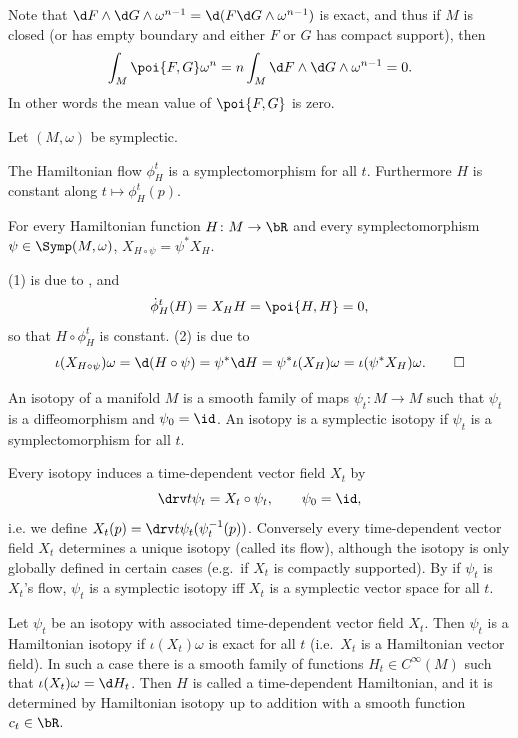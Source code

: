Note that $\d F\wedge\d G\wedge\omega^{n-1}=\d(F\d G\wedge\omega^{n-1})$ is exact, and thus if $M$ is closed (or has empty boundary and either $F$ or $G$ has compact
support), then
$$ \int_M\poi{F,G}\omega^n = n\int_M\d F\wedge\d G\wedge\omega^{n-1} = 0 . $$
In other words the mean value of $\poi{F,G}$ is zero.

\bprop[name={hamflowbasic}]

    Let $(M,\omega)$ be symplectic.
    \benum
        \item The Hamiltonian flow $\phi_H^t$ is a symplectomorphism for all $t$.
        Furthermore $H$ is constant along $t\mapsto\phi_H^t(p)$.
        \item For every Hamiltonian function $H\colon M\to\bR$ and every symplectomorphism $\psi\in\Symp(M,\omega)$, $X_{H\circ\psi}=\psi^*X_H$.
    \eenum

\eprop

\bproof

    (1) is due to , and
    $$ \dot\phi^t_H(H) = X_HH = \poi{H,H} = 0 , $$
    so that $H\circ\phi^t_H$ is constant.
    (2) is due to
    $$ \iota(X_{H\circ\psi})\omega = \d(H\circ\psi) = \psi^*\d H = \psi^*\iota(X_H)\omega = \iota(\psi^*X_H)\omega . \qed $$

\eproof

\bdefn

    An {\emphcolor isotopy} of a manifold $M$ is a smooth family of maps $\psi_t\colon M\to M$ such that $\psi_t$ is a diffeomorphism and $\psi_0=\id$.
    An isotopy is a {\emphcolor symplectic isotopy} if $\psi_t$ is a symplectomorphism for all $t$.

\edefn

Every isotopy induces a time-dependent vector field $X_t$ by
$$ \drv t\psi_t = X_t\circ\psi_t,\qquad \psi_0 = \id , $$
i.e. we define $X_t(p)=\drv t\psi_t(\psi_t^{-1}(p))$.
Conversely every time-dependent vector field $X_t$ determines a unique isotopy (called its {\emphcolor flow}), although the isotopy is only globally defined in
certain cases (e.g.\ if $X_t$ is compactly supported).
By  if $\psi_t$ is $X_t$'s flow, $\psi_t$ is a symplectic isotopy iff $X_t$ is a symplectic vector space for all $t$.

\bdefn

    Let $\psi_t$ be an isotopy with associated time-dependent vector field $X_t$.
    Then $\psi_t$ is a {\emphcolor Hamiltonian isotopy} if $\iota(X_t)\omega$ is exact for all $t$ (i.e.\ $X_t$ is a Hamiltonian vector field).
    In such a case there is a smooth family of functions $H_t\in C^\infty(M)$ such that $\iota(X_t)\omega=\d H_t$.
    Then $H$ is called a {\emphcolor time-dependent Hamiltonian}, and it is determined by Hamiltonian isotopy up to addition with a smooth function $c_t\in\bR$.

